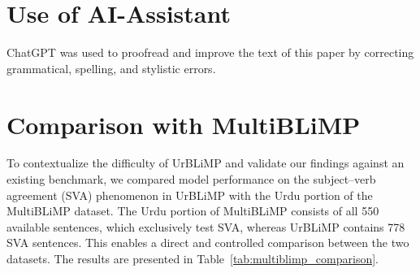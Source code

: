 \documentclass[11pt]{article}
\begin{document}
\section{Use of AI-Assistant}
ChatGPT was used to proofread and improve the text of this paper by correcting grammatical, spelling, and stylistic errors. 
\section{Comparison with MultiBLiMP}
\label{appendix:multiblimp}


To contextualize the difficulty of UrBLiMP and validate our findings against an existing benchmark, we compared model performance on the subject–verb agreement (SVA) phenomenon in UrBLiMP with the Urdu portion of the MultiBLiMP dataset. The Urdu portion of MultiBLiMP consists of all 550 available sentences, which exclusively test SVA, whereas UrBLiMP contains 778 SVA sentences. This enables a direct and controlled comparison between the two datasets. The results are presented in Table~\ref{tab:multiblimp_comparison}.
\end{document}
